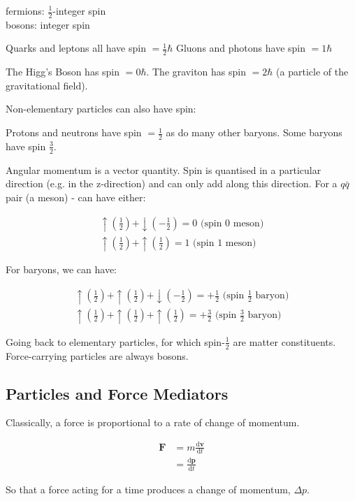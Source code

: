 \documentclass[10pt,a4paper]{article}
\newcommand{\suh}{\uparrow {\left(\frac{1}{2}\right)}}
\newcommand{\sdh}{\downarrow {\left(-\frac{1}{2}\right)}}
\begin{document}
\begin{center}
fermions: $\frac{1}{2}$-integer spin \\
bosons: integer spin
\end{center}

Quarks and leptons all have spin $= \frac{1}{2} \hbar$
Gluons and photons have spin $= 1 \hbar$

The Higg's Boson has spin $= 0 \hbar$.
The graviton has spin $=2 \hbar$ (a particle of the gravitational field).

Non-elementary particles can also have spin:

Protons and neutrons have spin $= \frac{1}{2}$ as do many other baryons. Some baryons have spin $\frac{3}{2}$.

Angular momentum is a vector quantity. Spin is quantised in a particular direction (e.g. in the z-direction) and can only add along this direction. For a $q\bar{q}$ pair (a meson) - can have either:

\begin{align*}
\suh + \sdh = 0 \text{ (spin 0 meson)} \\
\suh + \suh = 1 \text{ (spin 1 meson)}
\end{align*}

For baryons, we can have:

\begin{align*}
\suh + \suh + \sdh = + \frac{1}{2} \text{ (spin }\frac{1}{2}\text{ baryon)} \\
\suh + \suh + \suh = + \frac{3}{2} \text{ (spin }\frac{3}{2}\text{ baryon)}
\end{align*}

Going back to elementary particles, for which spin-$\frac{1}{2}$ are matter constituents. Force-carrying particles are always bosons.

\subsection*{Particles and Force Mediators}

Classically, a force is proportional to a rate of change of momentum.

\begin{align*}
\textbf{F} &= m \frac{\mathrm{d}\textbf{v}}{\mathrm{d}t} \\
&=  \frac{\mathrm{d}\textbf{p}}{\mathrm{d}t}
\end{align*}

So that a force acting for a time produces a change of momentum, $\Delta p$.
\end{document}
